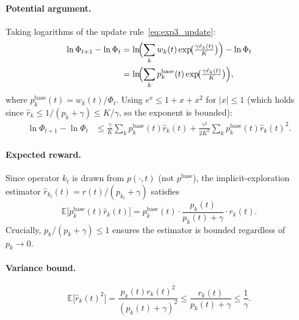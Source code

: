 \documentclass{article}
\newcommand{\E}{\mathbb{E}}
\begin{document}
\paragraph{Potential argument.}
Taking logarithms of the update rule~\eqref{eq:exp3_update}:
\begin{align}
  \ln\Phi_{t+1} - \ln\Phi_t
  &= \ln\!\Bigl(\sum_k w_k(t)\exp\!\bigl(\tfrac{\gamma\hat{r}_k(t)}{K}\bigr)\Bigr)
     - \ln\Phi_t \notag\\
  &= \ln\!\Bigl(\sum_k p^{\mathrm{base}}_k(t)
       \exp\!\bigl(\tfrac{\gamma\hat{r}_k(t)}{K}\bigr)\Bigr),
\end{align}
where $p^{\mathrm{base}}_k(t)=w_k(t)/\Phi_t$.  Using $e^x\le 1+x+x^2$ for
$|x|\le 1$ (which holds since $\hat{r}_k\le 1/(p_k+\gamma)\le K/\gamma$,
so the exponent is bounded):
\begin{align}
  \ln\Phi_{t+1}-\ln\Phi_t
  &\le \frac{\gamma}{K}\sum_k p^{\mathrm{base}}_k(t)\hat{r}_k(t)
     + \frac{\gamma^2}{2K^2}\sum_k p^{\mathrm{base}}_k(t)\hat{r}_k(t)^2.
  \label{eq:pot_ineq}
\end{align}

\paragraph{Expected reward.}
Since operator $k_t$ is drawn from $p(\cdot,t)$ (not $p^{\mathrm{base}}$), the
implicit-exploration estimator $\hat{r}_{k_t}(t)=r(t)/(p_{k_t}+\gamma)$
satisfies
\begin{equation}
  \E\bigl[p^{\mathrm{base}}_k(t)\hat{r}_k(t)\bigr]
  = p^{\mathrm{base}}_k(t)\cdot\frac{p_k(t)}{p_k(t)+\gamma}\cdot r_k(t).
  \label{eq:exp_reward}
\end{equation}
Crucially, $p_k/(p_k+\gamma)\le 1$ ensures the estimator is bounded
regardless of $p_k\to 0$.

\paragraph{Variance bound.}
\begin{equation}
  \E\bigl[\hat{r}_k(t)^2\bigr]
  = \frac{p_k(t)r_k(t)^2}{(p_k(t)+\gamma)^2}
  \le \frac{r_k(t)}{p_k(t)+\gamma}
  \le \frac{1}{\gamma}.
\end{equation}
\end{document}
